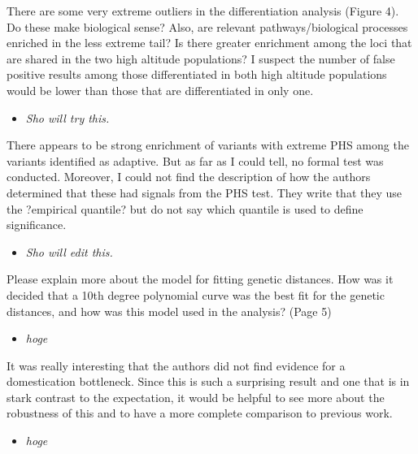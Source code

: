\documentclass[onecolumn,oneside,letterpaper]{article}
\begin{document}
There are some very extreme outliers in the differentiation analysis (Figure 4). Do these make biological sense? Also, are relevant pathways/biological processes enriched in the less extreme tail?  Is there greater enrichment among the loci that are shared in the two high altitude populations? I suspect the number of false positive results among those differentiated in both high altitude populations would be lower than those that are differentiated in only one.  
\setlength{\parskip}{-5.0pt}
\begin{itemize}
\item \textit{ Sho will try this. }
\end{itemize}
\setlength{\parskip}{10.0pt}

There appears to be strong enrichment of variants with extreme PHS among the variants identified as adaptive. But as far as I could tell, no formal test was conducted. Moreover, I could not find the description of how the authors determined that these had signals from the PHS test. They write that they use the ?empirical quantile? but do not say which quantile is used to define significance.  
\setlength{\parskip}{-5.0pt}
\begin{itemize}
\item \textit{ Sho will edit this. }
\end{itemize}
\setlength{\parskip}{10.0pt}

Please explain more about the model for fitting genetic distances.  How was it decided that a 10th degree polynomial curve was the best fit for the genetic distances, and how was this model used in the analysis? (Page 5)  
\setlength{\parskip}{-5.0pt}
\begin{itemize}
\item \textit{ hoge }
\end{itemize}
\setlength{\parskip}{10.0pt}

It was really interesting that the authors did not find evidence for a domestication bottleneck.  Since this is such a surprising result and one that is in stark contrast to the expectation, it would be helpful to see more about the robustness of this and to have a more complete comparison to previous work.  
\setlength{\parskip}{-5.0pt}
\begin{itemize}
\item \textit{ hoge }
\end{itemize}
\setlength{\parskip}{10.0pt}
\end{document}
